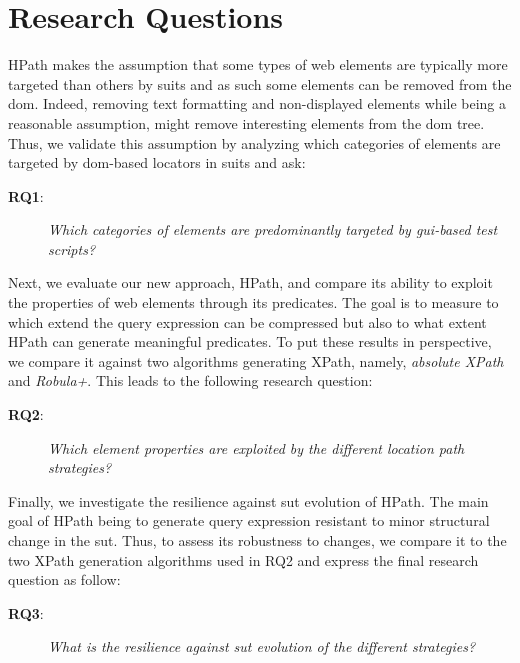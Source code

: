 \section{Research Questions}
\label{sec:hpath-rqs}

HPath makes the assumption that some types of web elements are typically more targeted than others by \gls{suit}s and as such some elements can be removed from the \gls{dom}. Indeed, removing text formatting and non-displayed elements while being a reasonable assumption, might remove interesting elements from the \gls{dom} tree. Thus, we validate this assumption by analyzing which categories of elements are targeted by \gls{dom}-based locators in \gls{suit}s and ask:

\begin{description} 
\item[\textbf{RQ1}:]
\emph{Which categories of elements are predominantly targeted by \gls{gui}-based test scripts?} 
\end{description} 

Next, we evaluate our new approach, HPath, and compare its ability to exploit the properties of web elements through its predicates. The goal is to measure to which extend the query expression can be compressed but also to what extent HPath can generate meaningful predicates. To put these results in perspective, we compare it against two algorithms generating XPath, namely, \emph{absolute XPath} and \emph{Robula+}. This leads to the following research question:

\begin{description} 
\item[\textbf{RQ2}:]
\emph{Which element properties are exploited by the different location path strategies?} 
\end{description} 
        
Finally, we investigate the resilience against \gls{sut} evolution of HPath. The main goal of HPath being to generate query expression resistant to minor structural change in the \gls{sut}. Thus, to assess its robustness to changes, we compare it to the two XPath generation algorithms used in RQ2 and express the final research question as follow:

\begin{description} 
\item[\textbf{RQ3}:]
\emph{What is the resilience against \gls{sut} evolution of the different strategies?} 
\end{description} 